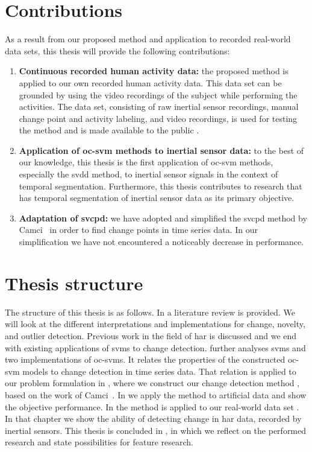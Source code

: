 \section{Contributions}
As a result from our proposed method and application to recorded real-world data sets, this thesis will provide the following contributions:
\begin{enumerate}
  \item \textbf{Continuous recorded human activity data:} the proposed method is applied to our own recorded human activity data.
  This data set can be grounded by using the video recordings of the subject while performing the activities.
  The data set, consisting of raw inertial sensor recordings, manual change point and activity labeling, and video recordings, is used for testing the method and is made available to the public \cite{vlasveld2013continuous}.
  \item \textbf{Application of \gls{oc-svm} methods to inertial sensor data:} to the best of our knowledge, this thesis is the first application of \gls{oc-svm} methods, especially the \gls{svdd} method, to inertial sensor signals in the context of temporal segmentation.
  Furthermore, this thesis contributes to research that has temporal segmentation of inertial sensor data as its primary objective.
  \item \textbf{Adaptation of \acrshort{svcpd}:} we have adopted and simplified the \acrshort{svcpd} method by Camci~\cite{camci2010change} in order to find change points in time series data.
  In our simplification we have not encountered a noticeably decrease in performance.
\end{enumerate}

\section{Thesis structure}
The structure of this thesis is as follows.
In  a literature review is provided.
We will look at the different interpretations and implementations for change, novelty, and outlier detection.
Previous work in the field of \gls{har} is discussed and we end with existing applications of \glspl{svm} to change detection.
 further analyses \glspl{svm} and two implementations of \glspl{oc-svm}.
It relates the properties of the constructed \gls{oc-svm} models to change detection in time series data.
That relation is applied to our problem formulation in , where we construct our change detection method , based on the work of Camci~\cite{camci2010change}.
In  we apply the method to artificial data and show the objective performance.
In  the method is applied to our real-world data set .
In that chapter we show the ability of detecting change in \gls{har} data, recorded by inertial sensors.
This thesis is concluded in , in which we reflect on the performed research and state possibilities for feature research.